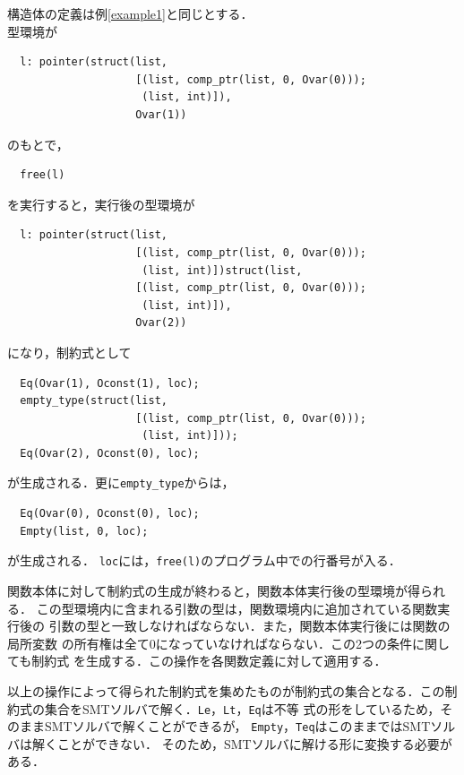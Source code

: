 \begin{example}[制約生成]
構造体の定義は例\ref{example1}と同じとする．\\
型環境が
\begin{verbatim}
  l: pointer(struct(list,
                    [(list, comp_ptr(list, 0, Ovar(0)));
                     (list, int)]),
                    Ovar(1))
\end{verbatim}
のもとで，
\begin{verbatim}
  free(l)
\end{verbatim}
を実行すると，実行後の型環境が
\begin{verbatim}
  l: pointer(struct(list,
                    [(list, comp_ptr(list, 0, Ovar(0)));
                     (list, int)])struct(list,
                    [(list, comp_ptr(list, 0, Ovar(0)));
                     (list, int)]),
                    Ovar(2))
\end{verbatim}
になり，制約式として
\begin{verbatim}
  Eq(Ovar(1), Oconst(1), loc);
  empty_type(struct(list,
                    [(list, comp_ptr(list, 0, Ovar(0)));
                     (list, int)]));
  Eq(Ovar(2), Oconst(0), loc);
\end{verbatim}
が生成される．更に\texttt{empty\_type}からは，
\begin{verbatim}
  Eq(Ovar(0), Oconst(0), loc);
  Empty(list, 0, loc);
\end{verbatim}
が生成される．
\texttt{loc}には，\texttt{free(l)}のプログラム中での行番号が入る．
\end{example}

関数本体に対して制約式の生成が終わると，関数本体実行後の型環境が得られる．
この型環境内に含まれる引数の型は，関数環境内に追加されている関数実行後の
引数の型と一致しなければならない．また，関数本体実行後には関数の局所変数
の所有権は全て0になっていなければならない．この2つの条件に関しても制約式
を生成する．この操作を各関数定義に対して適用する．

以上の操作によって得られた制約式を集めたものが制約式の集合となる．この制
約式の集合をSMTソルバで解く．\texttt{Le}，\texttt{Lt}，\texttt{Eq}は不等
式の形をしているため，そのままSMTソルバで解くことができるが，
\texttt{Empty}，\texttt{Teq}はこのままではSMTソルバは解くことができない．
そのため，SMTソルバに解ける形に変換する必要がある．

